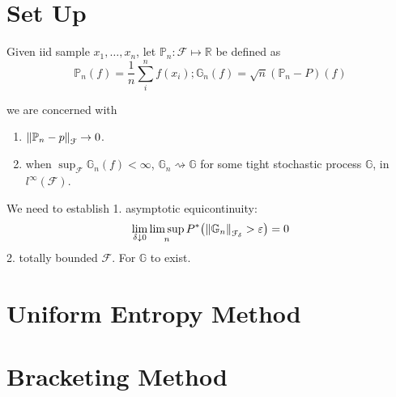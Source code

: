 \newcommand{\mbp}{\mathbb{P}}
\newcommand{\mbg}{\mathbb{G}}
\section{Set Up}
Given iid sample \(x_{1},\dots, x_{n}\), let \(\mbp_{n}:\mathcal{F}\mapsto \mathbb{R}\) be defined as 
\begin{equation*}
    \mbp_{n}(f) = \frac{1}{n} \sum_{i}^{n} f(x_{i}); \mbg_{n}(f) = \sqrt{n} (\mbp_{n} - P)(f)
\end{equation*}

we are concerned with 
\begin{enumerate}
    \item \(\norm{\mbp_{n} - p}_{\mathcal{F}} \to 0\). 
    \item when \(\sup_{\mathcal{F}}  \mbg_{n}(f) < \infty\), \(\mbg_{n} \rightsquigarrow \mbg\) for some tight stochastic process \(\mbg\), in \(l^{\infty}(\mathcal{F})\). 
\end{enumerate}

\begin{lemma}
    We need to establish 1. asymptotic equicontinuity:
    \begin{equation*}
        \lim_{\delta\downarrow 0}\limsup_{n} P^{*}\pqty{\norm{\mbg_{n}}_{\mathcal{F}_{\delta}} > \epsilon} = 0
    \end{equation*}
    2. totally bounded \(\mathcal{F}\). For \(\mbg\) to exist. 
\end{lemma}

\section{Uniform Entropy Method}


\section{Bracketing Method}